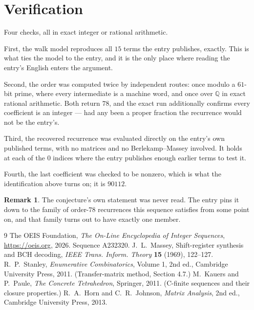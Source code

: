 \documentclass[11pt,a4paper]{article}
\theoremstyle{plain}
\theoremstyle{definition}
\newtheorem{remark}[theorem]{Remark}
\begin{document}
\section{Verification}

Four checks, all in exact integer or rational arithmetic.

First, the walk model reproduces all $15$ terms the entry publishes, exactly. This is
what ties the model to the entry, and it is the only place where reading the entry's English
enters the argument.

Second, the order was computed twice by independent routes: once modulo a $61$-bit prime, where
every intermediate is a machine word, and once over $\mathbb{Q}$ in exact rational arithmetic.
Both return $78$, and the exact run additionally confirms every coefficient is an integer
--- had any been a proper fraction the recurrence would not be the entry's.

Third, the recovered recurrence was evaluated directly on the entry's own published terms, with
no matrices and no Berlekamp--Massey involved. It holds at each of the $0$ indices where
the entry publishes enough earlier terms to test it.

Fourth, the last coefficient was checked to be nonzero, which is what the identification above
turns on; it is $90112$.

\begin{remark}
The conjecture's own statement was never read. The entry pins it down to the family of
order-$78$ recurrences this sequence satisfies from some point on, and that family turns
out to have exactly one member.
\end{remark}

\begin{thebibliography}{9}
 The OEIS Foundation, \emph{The On-Line Encyclopedia of Integer
Sequences}, \url{https://oeis.org}, 2026. Sequence A232320.
 J.~L.~Massey, Shift-register synthesis and BCH decoding, \emph{IEEE
Trans. Inform. Theory} \textbf{15} (1969), 122--127.
 R.~P.~Stanley, \emph{Enumerative Combinatorics}, Volume 1, 2nd ed.,
Cambridge University Press, 2011. (Transfer-matrix method, Section 4.7.)
 M.~Kauers and P.~Paule, \emph{The Concrete Tetrahedron}, Springer, 2011.
(C-finite sequences and their closure properties.)
 R.~A.~Horn and C.~R.~Johnson, \emph{Matrix Analysis}, 2nd ed., Cambridge
University Press, 2013.
\end{thebibliography}
\end{document}
